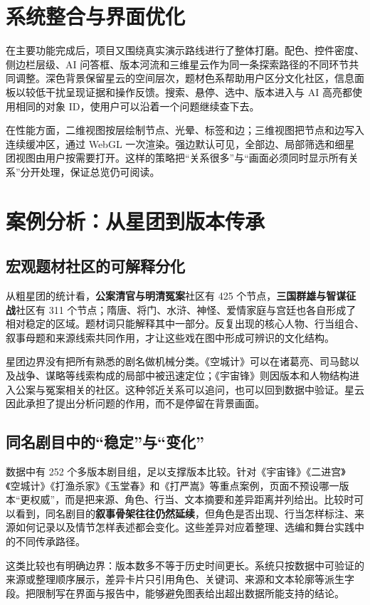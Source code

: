 \documentclass[12pt,a4paper]{article}
\newcommand{\keyterm}[1]{\textcolor{OperaRed}{\textbf{#1}}}
\begin{document}
\section{系统整合与界面优化}
在主要功能完成后，项目又围绕真实演示路线进行了整体打磨。配色、控件密度、侧边栏层级、AI 问答框、版本河流和三维星云作为同一条探索路径的不同环节共同调整。深色背景保留星云的空间层次，题材色系帮助用户区分文化社区，信息面板以较低干扰呈现证据和操作反馈。搜索、悬停、选中、版本进入与 AI 高亮都使用相同的对象 ID，使用户可以沿着一个问题继续查下去。

在性能方面，二维视图按层绘制节点、光晕、标签和边；三维视图把节点和边写入连续缓冲区，通过 WebGL 一次渲染。强边默认可见，全部边、局部筛选和细星团视图由用户按需要打开。这样的策略把“关系很多”与“画面必须同时显示所有关系”分开处理，保证总览仍可阅读。

\section{案例分析：从星团到版本传承}
\subsection{宏观题材社区的可解释分化}
从粗星团的统计看，\keyterm{公案清官与明清冤案}社区有 425 个节点，\keyterm{三国群雄与智谋征战}社区有 311 个节点；隋唐、将门、水浒、神怪、爱情家庭与宫廷也各自形成了相对稳定的区域。题材词只能解释其中一部分。反复出现的核心人物、行当组合、叙事母题和来源线索共同作用，才让这些戏在图中形成可辨识的文化结构。

星团边界没有把所有熟悉的剧名做机械分类。《空城计》可以在诸葛亮、司马懿以及战争、谋略等线索构成的局部中被迅速定位；《宇宙锋》则因版本和人物结构进入公案与冤案相关的社区。这种邻近关系可以追问，也可以回到数据中验证。星云因此承担了提出分析问题的作用，而不是停留在背景画面。

\subsection{同名剧目中的“稳定”与“变化”}
数据中有 252 个多版本剧目组，足以支撑版本比较。针对《宇宙锋》《二进宫》《空城计》《打渔杀家》《玉堂春》和《打严嵩》等重点案例，页面不预设哪一版本“更权威”，而是把来源、角色、行当、文本摘要和差异距离并列给出。比较时可以看到，同名剧目的\keyterm{叙事骨架往往仍然延续}，但角色是否出现、行当怎样标注、来源如何记录以及情节怎样表述都会变化。这些差异对应着整理、选编和舞台实践中的不同传承路径。

这类比较也有明确边界：版本数多不等于历史时间更长。系统只按数据中可验证的来源或整理顺序展示，差异卡片只引用角色、关键词、来源和文本轮廓等派生字段。把限制写在界面与报告中，能够避免图表给出超出数据所能支持的结论。
\end{document}
